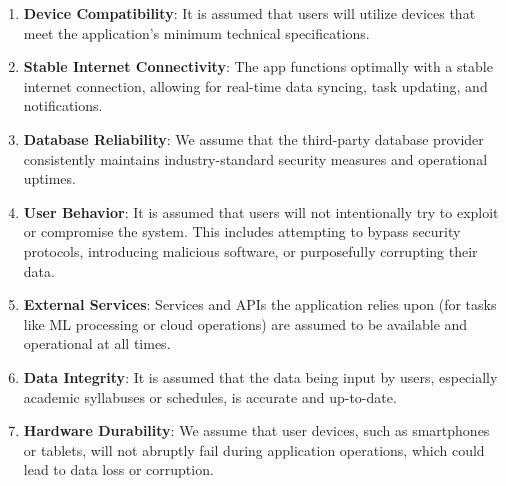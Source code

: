 \documentclass{article}
\begin{document}
\begin{enumerate}
    \item \textbf{Device Compatibility}: It is assumed that users will utilize devices that meet the application's minimum technical specifications.
    \item \textbf{Stable Internet Connectivity}: The app functions optimally with a stable internet connection, allowing for real-time data syncing, task updating, and notifications.
    \item \textbf{Database Reliability}: We assume that the third-party database provider consistently maintains industry-standard security measures and operational uptimes.
    \item \textbf{User Behavior}: It is assumed that users will not intentionally try to exploit or compromise the system. This includes attempting to bypass security protocols, introducing malicious software, or purposefully corrupting their data.
    \item \textbf{External Services}: Services and APIs the application relies upon (for tasks like ML processing or cloud operations) are assumed to be available and operational at all times.
    \item \textbf{Data Integrity}: It is assumed that the data being input by users, especially academic syllabuses or schedules, is accurate and up-to-date.
    \item \textbf{Hardware Durability}: We assume that user devices, such as smartphones or tablets, will not abruptly fail during application operations, which could lead to data loss or corruption.
\end{enumerate}
\end{document}
